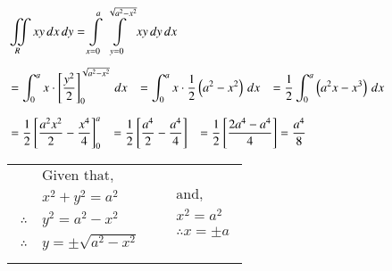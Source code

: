 \documentclass[11pt]{extarticle}
\newcommand{\dx}{{\,dx}}
\newcommand{\dy}{{\,dy}}
\newcommand{\mint}{\int\displaylimits}
\newcommand{\miint}{\iint\displaylimits}
\begin{document}
\begin{minipage}[t]{0.66\linewidth}
\noindent
   \begin{adjustbox}{valign=t}
      $\begin{aligned}
         & \miint_R xy\dx\dy = \mint_{x=0}^a \mint_{y=0}^{\sqrt{a^2-x^2}} xy \dy\dx  \\[1ex]
         & =\int_0^a x \cdot \left[\frac{y^2}{2}\right]_0^{\sqrt{a^2-x^2}} \dx
         \tab =\int_0^a x  \cdot \frac{1}{2}\left(a^2-x^2\right) \dx
         \tab =\frac{1}{2} \int_0^a \left(a^2x-x^3\right) \dx \\[1.5ex]
         & =\frac{1}{2}\left[\frac{a^2 x^2}{2}-\frac{x^4}{4}\right]_0^a
         \tab =\frac{1}{2}\left[\frac{a^4}{2}-\frac{a^4}{4}\right]
         \tab =\frac{1}{2}\left[\frac{2 a^4-a^4}{4}\right]=\frac{a^4}{8}
      \end{aligned}$
   \end{adjustbox}
\end{minipage}\hspace{0.5ex}
\begin{minipage}[t]{0.32\linewidth}
\noindent
   \begin{adjustbox}{valign=t}
   \end{adjustbox}
   \begin{tabular}{ll}
      $\begin{aligned}
         & \text{Given that, }\\
         & x^2+y^2=a^2 \\
         \therefore \ & y^2=a^2-x^2 \\
         \therefore \ & y= \pm \sqrt{a^2-x^2}\\
      \end{aligned}$
      &
      \hspace{0.5em}
      $\begin{aligned}
         & \text {and, } \\
         & x^2=a^2 \\
         & \therefore x= \pm a
      \end{aligned}$
   \end{tabular}
\end{minipage}
\end{document}
